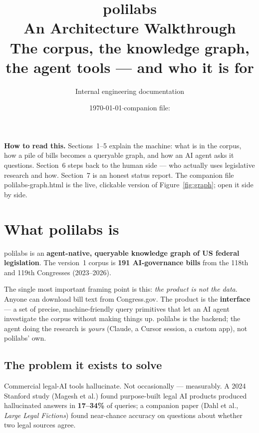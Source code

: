 \documentclass[11pt]{article}
\title{\vspace{-1.2cm}\textbf{\textsf{polilabs}}\\[0.2cm]
  {\Large An Architecture Walkthrough}\\[0.15cm]
  {\normalsize\color{ink2}The corpus, the knowledge graph, the agent tools ---
   and who it is for}}
\author{\textsf{\small Internal engineering documentation}}
\date{\textsf{\small \today\quad$\cdot$\quad companion file: \code{polilabs-graph.html}}}
\newcommand{\code}[1]{{\ttfamily\small #1}}
\newcommand{\sectionrule}{\vspace{-0.6em}{\color{rule}\hrule height 1pt}\vspace{0.4em}}
\begin{document}
\maketitle
\thispagestyle{empty}

\begin{center}
\begin{minipage}{0.9\textwidth}
\small\color{ink2}
\textbf{How to read this.} Sections~1--5 explain the machine: what is in the
corpus, how a pile of bills becomes a queryable graph, and how an AI agent
asks it questions. Section~6 steps back to the human side --- who actually
uses legislative research and how. Section~7 is an honest status report.
The companion file \code{polilabs-graph.html} is the live, clickable version
of Figure~\ref{fig:graph}; open it side by side.
\end{minipage}
\end{center}

\vspace{0.3cm}
\sectionrule

\tableofcontents
\vspace{0.4cm}
\sectionrule

\section{What polilabs is}

polilabs is an \textbf{agent-native, queryable knowledge graph of US federal
legislation}. The version~1 corpus is \textbf{191 AI-governance bills} from the
118th and 119th Congresses (2023--2026).

The single most important framing point is this: \emph{the product is not the
data}. Anyone can download bill text from Congress.gov. The product is the
\textbf{interface} --- a set of precise, machine-friendly query primitives that
let an AI agent investigate the corpus without making things up. polilabs is the
backend; the agent doing the research is \emph{yours} (Claude, a Cursor
session, a custom app), not polilabs' own.

\subsection{The problem it exists to solve}

Commercial legal-AI tools hallucinate. Not occasionally --- measurably. A 2024
Stanford study (Magesh et al.) found purpose-built legal AI products produced
hallucinated answers in \textbf{17--34\%} of queries; a companion paper (Dahl et
al., \emph{Large Legal Fictions}) found near-chance accuracy on questions about
whether two legal sources agree.
\end{document}
